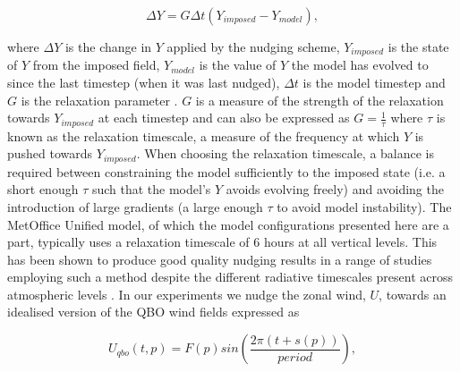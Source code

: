 \begin{equation} \label{eq:nudging}
\Delta Y = G \Delta t (Y_{imposed} - Y_{model}), 
\end{equation}

where $\Delta Y$ is the change in $Y$ applied by the nudging scheme, $Y_{imposed}$ is the state of $Y$ from the imposed field, $Y_{model}$ is the value of $Y$ the model has evolved to since the last timestep (when it was last nudged), $\Delta t$ is the model timestep and $G$ is the relaxation parameter \citep{telfordTechnical2008}. $G$ is a measure of the strength of the relaxation towards $Y_{imposed}$ at each timestep and can also be expressed as $G = \frac{1}{\tau}$ where $\tau$ is known as the relaxation timescale, a measure of the frequency at which $Y$ is pushed towards $Y_{imposed}$. When choosing the relaxation timescale, a balance is required between constraining the model sufficiently to the imposed state (i.e. a short enough $\tau$ such that the model's $Y$ avoids evolving freely) and avoiding the introduction of large gradients (a large enough $\tau$ to avoid model instability). The MetOffice Unified model, of which the model configurations presented here are a part, typically uses a relaxation timescale of 6 hours at all vertical levels. This has been shown to produce good quality nudging results in a range of studies employing such a method despite the different radiative timescales present across atmospheric levels \citep{grayForecasting2020}. In our experiments we nudge the zonal wind, $U$, towards an idealised version of the QBO wind fields expressed as 

\begin{equation} \label{eq:imposed_U}
U_{qbo}(t, p) = F(p) sin(\frac{2\pi (t + s(p))}{period}),
\end{equation}

